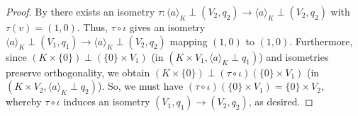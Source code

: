 \documentclass[12pt, leqno, british]{amsart}
\theoremstyle{definition}
\theoremstyle{plain}
\theoremstyle{remark}
\begin{document}
\begin{proof}
By  there exists an isometry $\tau : \langle a \rangle_K \perp (V_2, q_2) \to \langle a \rangle_K \perp (V_2, q_2)$ with $\tau(v) = (1, 0)$.
Thus, $\tau \circ \iota$ gives an isometry $\langle a \rangle_K \perp (V_1, q_1) \to \langle a \rangle_K \perp (V_2, q_2)$ mapping $(1, 0)$ to $(1, 0)$.
Furthermore, since $(K \times \lbrace 0 \rbrace) \perp (\lbrace 0 \rbrace \times V_1)$ (in $(K \times V_1, \langle a \rangle_K \perp q_1)$) and isometries preserve orthogonality, we obtain $(K \times \lbrace 0 \rbrace) \perp (\tau \circ \iota)(\lbrace 0 \rbrace \times V_1)$ (in $(K \times V_2, \langle a \rangle_K \perp q_2)$).
So, we must have $(\tau \circ \iota)(\lbrace 0 \rbrace \times V_1) = \lbrace 0 \rbrace \times V_2$, whereby $\tau \circ \iota$ induces an isometry $(V_1, q_1) \to (V_2, q_2)$, as desired.
\end{proof}
\end{document}
